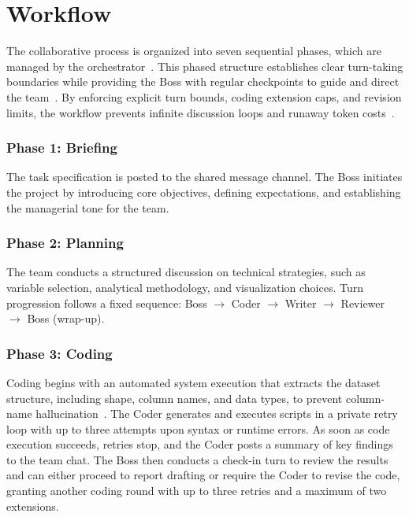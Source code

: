 \section{Workflow}
\label{sec:workflow}

The collaborative process is organized into seven sequential phases, which are managed by the orchestrator~\cite{hong2024metagptmetaprogrammingmultiagent, qian2024chatdevcommunicativeagentssoftware}.
This phased structure establishes clear turn-taking boundaries while providing the Boss with regular checkpoints to guide and direct the team~\cite{wang2025talkstructurallyacthierarchically}.
By enforcing explicit turn bounds, coding extension caps, and revision limits, the workflow prevents infinite discussion loops and runaway token costs~\cite{qian2024chatdevcommunicativeagentssoftware, li2023camelcommunicativeagentsmind}.

\subsubsection{Phase 1: Briefing}
\label{subsubsec:phase-1-briefing}

The task specification is posted to the shared message channel.
The Boss initiates the project by introducing core objectives, defining expectations, and establishing the managerial tone for the team.

\subsubsection{Phase 2: Planning}
\label{subsubsec:phase-2-planning}

The team conducts a structured discussion on technical strategies, such as variable selection, analytical methodology, and visualization choices.
Turn progression follows a fixed sequence: Boss $\rightarrow$ Coder $\rightarrow$ Writer $\rightarrow$ Reviewer $\rightarrow$ Boss (wrap-up).

\subsubsection{Phase 3: Coding}
\label{subsubsec:phase-3-coding}

Coding begins with an automated system execution that extracts the dataset structure, including shape, column names, and data types, to prevent column-name hallucination~\cite{white2023promptpatterncatalogenhance, qian2024chatdevcommunicativeagentssoftware}.
The Coder generates and executes scripts in a private retry loop with up to three attempts upon syntax or runtime errors.
As soon as code execution succeeds, retries stop, and the Coder posts a summary of key findings to the team chat.
The Boss then conducts a check-in turn to review the results and can either proceed to report drafting or require the Coder to revise the code, granting another coding round with up to three retries and a maximum of two extensions.

